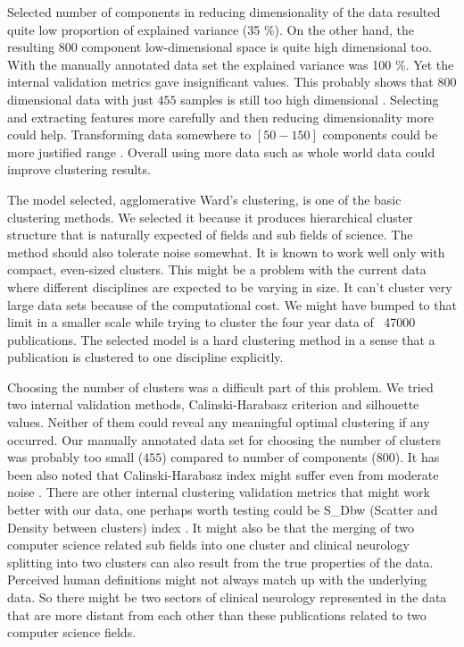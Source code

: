 Selected number of components in reducing dimensionality of the 
data resulted quite low proportion of explained variance (35 \%).
On the other hand, the resulting $800$ component low-dimensional
space is quite high dimensional too.
With the manually annotated data set the explained variance was 
100 \%. Yet the internal validation metrics gave insignificant 
values. This probably shows that $800$ dimensional data with just 
$455$ samples is still too high dimensional \cite{aggarwal_surprising_2001}. 
Selecting and extracting features more carefully and then reducing
dimensionality more could help. Transforming data somewhere to 
$[50-150]$ components could be more justified range 
\cite{dolnicar_review_2002}. Overall using more data such as whole
world data could improve clustering results.

The model selected, agglomerative Ward's clustering, is one of the
basic clustering methods. We selected it because it produces 
hierarchical cluster structure that is naturally expected of fields
and sub fields of science. The method should also tolerate noise 
somewhat.
It is known to work well only with compact, even-sized clusters.
This might be a problem with the current data where different 
disciplines are expected to be varying in size.
It can't cluster very large data sets because of the computational
cost. We might have bumped to that limit in a smaller scale while 
trying to cluster the four year data of ~47000 publications.
The selected model is a hard clustering method in a sense that a
publication is clustered to one discipline explicitly.


Choosing the number of clusters was a difficult part of this 
problem. We tried two internal validation methods,
Calinski-Harabasz criterion and silhouette values. Neither of them
could reveal any meaningful optimal clustering if any occurred.
Our manually annotated data set for choosing the number of clusters
was probably too small ($455$) compared to number of components 
($800$). 
It has been also noted that Calinski-Harabasz index 
might suffer even from moderate noise \cite{liu_understanding_2010}.
There are other internal clustering validation metrics that might 
work better with our data, one perhaps worth testing could be
S\_Dbw (Scatter and Density between clusters) index 
\cite{halkidi_clustering_2001}. 
It might also be that the merging of two computer science related 
sub fields into one cluster and clinical neurology splitting into 
two clusters can also result from the true properties of the data.
Perceived human definitions might not always match up with the 
underlying data. So there might be two sectors of clinical 
neurology represented in the data that are more distant from each 
other than these publications related to two computer science fields.

